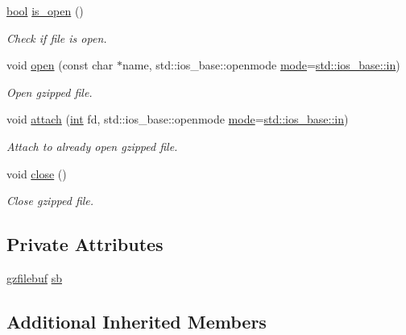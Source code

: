 \begin{DoxyCompactItemize}
\item 
\mbox{\hyperlink{libretro_8h_a4a26dcae73fb7e1528214a068aca317e}{bool}} \mbox{\hyperlink{classgzifstream_a8e9de13b311b698ef0ccc276b71c7941}{is\+\_\+open}} ()
\begin{DoxyCompactList}\small\item\em Check if file is open. \end{DoxyCompactList}\item 
void \mbox{\hyperlink{classgzifstream_a8105f9300d36dafbe8b10c204583f5a1}{open}} (const char $\ast$name, std\+::ios\+\_\+base\+::openmode \mbox{\hyperlink{ioapi_8h_a7e43d41c2fe013a373b540cba02505cf}{mode}}=\mbox{\hyperlink{gun_8c_a8bab68b4d22f69428207fabb60dc4f5c}{std\+::ios\+\_\+base\+::in}})
\begin{DoxyCompactList}\small\item\em Open gzipped file. \end{DoxyCompactList}\item 
void \mbox{\hyperlink{classgzifstream_a24aff901c395acbdaddb7878f4ddb7aa}{attach}} (\mbox{\hyperlink{ioapi_8h_a787fa3cf048117ba7123753c1e74fcd6}{int}} fd, std\+::ios\+\_\+base\+::openmode \mbox{\hyperlink{ioapi_8h_a7e43d41c2fe013a373b540cba02505cf}{mode}}=\mbox{\hyperlink{gun_8c_a8bab68b4d22f69428207fabb60dc4f5c}{std\+::ios\+\_\+base\+::in}})
\begin{DoxyCompactList}\small\item\em Attach to already open gzipped file. \end{DoxyCompactList}\item 
void \mbox{\hyperlink{classgzifstream_a073fadd9dc90195c47a6ae2d863c8ace}{close}} ()
\begin{DoxyCompactList}\small\item\em Close gzipped file. \end{DoxyCompactList}\end{DoxyCompactItemize}
\subsection*{Private Attributes}
\begin{DoxyCompactItemize}
\item 
\mbox{\hyperlink{classgzfilebuf}{gzfilebuf}} \mbox{\hyperlink{classgzifstream_a5bc9c8a3a1b4b40b43161c372ba852e2}{sb}}
\end{DoxyCompactItemize}
\subsection*{Additional Inherited Members}


